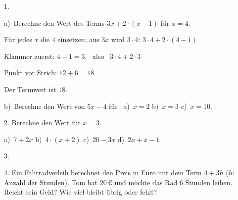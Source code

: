 \documentclass[11pt]{article}
\newcommand{\kennung}{MZE}
\newcommand{\grau}[1]{{\color{mbgrau}#1}}
\begin{document}
\pfheftstil
\fancyfoot[C]{\parbox[t]{\textwidth}{\mbfhbox\par\vspace{1.5mm}{\footnotesize\color{mbgrau}{\scriptsize \kennung}\hfill\thepage}}}
\begin{pfaufg}{}{1.}{}
\grau{a)\ Berechne den Wert des Terms $3x + 2 \cdot (x - 1)$ für $x = 4$.\par\smallskip Für jedes $x$ die $4$ einsetzen; aus $3x$ wird $3 \cdot 4$: \quad $3 \cdot 4 + 2 \cdot (4 - 1)$\par Klammer zuerst: \quad $4 - 1 = 3$, \ also \ $3 \cdot 4 + 2 \cdot 3$\par Punkt vor Strich: \quad $12 + 6 = 18$\par Der Termwert ist $18$.}
\par\medskip
b)\ Berechne den Wert von $5x - 4$ für \ a)~$x = 2$ \qquad b)~$x = 3$ \qquad c)~$x = 10$.
\end{pfaufg}

\begin{pfaufg}{}{2.}{}
Berechne den Wert für $x = 3$. \par\vspace{3pt} a)~$7 + 2x$ \qquad b)~$4 \cdot (x + 2)$ \qquad c)~$20 - 3x$ \qquad d)~$2x + x - 1$
\end{pfaufg}

\begin{pfaufg}{}{3.}{}
\end{pfaufg}

\begin{pfaufg}{}{4.}{}
Ein Fahrradverleih berechnet den Preis in Euro mit dem Term $4 + 3h$ ($h$: Anzahl der Stunden). Tom hat 20\,€ und möchte das Rad 6 Stunden leihen. Reicht sein Geld? Wie viel bleibt übrig oder fehlt?
\end{pfaufg}
\end{document}

